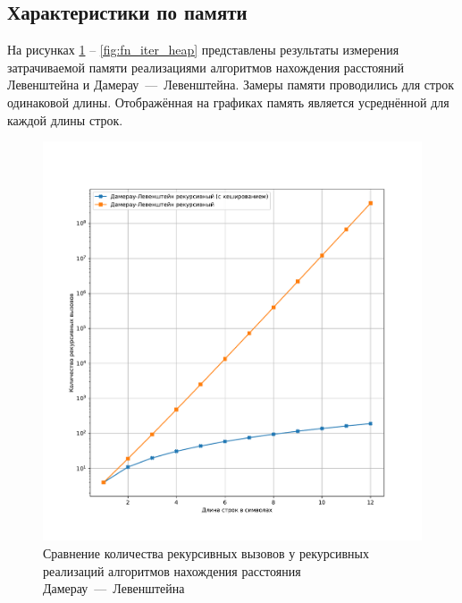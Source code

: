 \subsection{Характеристики по памяти}

На рисунках \ref{fig:fn_rec_calls} -- \ref{fig:fn_iter_heap} представлены результаты измерения затрачиваемой памяти реализациями алгоритмов нахождения расстояний Левенштейна и Дамерау~---~Левенштейна.
Замеры памяти проводились для строк одинаковой длины.
Отображённая на графиках память является усреднённой для каждой длины строк.

\begin{figure}[H]
	\centering
	\includegraphics[width=\textwidth]{img/fn_rec_calls.pdf}
	\caption{Сравнение количества рекурсивных вызовов у рекурсивных реализаций алгоритмов нахождения расстояния Дамерау~---~Левенштейна}
	\label{fig:fn_rec_calls}
\end{figure}

